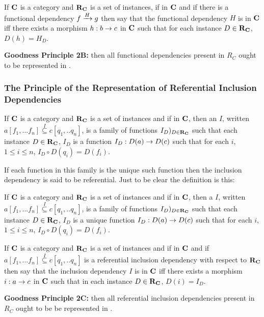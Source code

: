 \begin{definition}
If $\catc$ is a category and $\reqtc$ is a set of instances, if
\fgsourcediag
in $\catc$ 
and if there is a functional dependency $\fundep{H}{f}{g}$ then say that 
the functional dependency $H$ is  in $\catc$ 
iff there exists a morphism $h:b \morph c$ in $\catc$ such that for each instance $D \in \reqtc$, $D(h)=H_D$.
\end{definition}

\textbf {Goodness Principle 2B:} \IfSforCwithRCwords then all functional dependencies present in $R_C$
ought to be represented in \catc.


\subsubsection{The Principle of the Representation of Referential Inclusion Dependencies}

\begin{definition}
If $\catc$ is a category and $\reqtc$ is a set of instances 
and if
\fnsourceqnsource
in $\catc$, then an  $I$, written $a[f_1,...f_n] \overset{I}{\subseteq} c[q_1,..q_n]$, is a family of functions $I_D)_{D \in \reqtc}$
such that each instance $D \in \reqtc$, $I_D$ is a function $I_D : D(a) \morph D(c)$ such that
for each $i$, $1 \leq i \le n$, $I_D \circ D(q_i) = D(f_i)$.
\end{definition}

If each function in this family is the unique such function then the inclusion dependency is said to be referential. Just to be clear the definition is this:
\begin{definition}
If $\catc$ is a category and $\reqtc$ is a set of instances 
and if
\fnsourceqnsource
in $\catc$, then a  $I$, written $a[f_1,...f_n] \overset{I}{\subseteq} c[q_1,..q_n]$, is a family of functions $I_D)_{D \in \reqtc}$
such that each instance $D \in \reqtc$, $I_D$ is a unique function $I_D : D(a) \morph D(c)$ such that
for each $i$, $1 \leq i \le n$, $I_D \circ D(q_i) = D(f_i)$.
\end{definition}




\begin{definition}
If $\catc$ is a category and $\reqtc$ is a set of instances and if
\fnsourceqnsource
in $\catc$ and if $a[f_1,...f_n] \overset{I}{\subseteq} c[q_1,..q_n]$ is a referential inclusion dependency
with respect  to $\reqtc$ then say that the inclusion dependency $I$ is  in $\catc$
iff there exists a morphism $i:a \morph c$ in $\catc$ such that in each instance $D \in \reqtc$, $D(i) = I_D$. 
\end{definition}

\textbf {Goodness Principle 2C:} \IfSforCwithRCwords 
then all referential inclusion dependencies present in $R_C$
ought to be be represented in \catc.